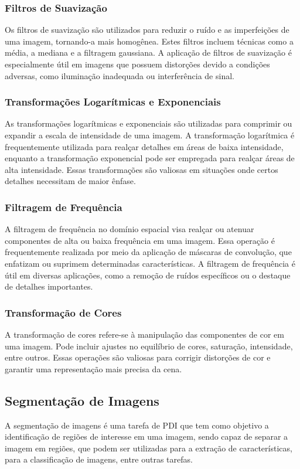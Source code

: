 \documentclass[conference]{IEEEtran}
\begin{document}
\subsubsection{Filtros de Suavização}
Os filtros de suavização são utilizados para reduzir o ruído e as imperfeições de uma imagem,
tornando-a mais homogênea. Estes filtros incluem técnicas como a média, a mediana e a filtragem 
gaussiana. A aplicação de filtros de suavização é especialmente útil em imagens que possuem 
distorções devido a condições adversas, como iluminação inadequada ou interferência de sinal.

\subsubsection{Transformações Logarítmicas e Exponenciais}
As transformações logarítmicas e exponenciais são utilizadas para comprimir ou expandir a 
escala de intensidade de uma imagem. A transformação logarítmica é frequentemente utilizada 
para realçar detalhes em áreas de baixa intensidade, enquanto a transformação exponencial pode 
ser empregada para realçar áreas de alta intensidade. 
Essas transformações são valiosas em situações onde certos detalhes necessitam de maior ênfase.

\subsubsection{Filtragem de Frequência}
A filtragem de frequência no domínio espacial visa realçar ou atenuar componentes 
de alta ou baixa frequência em uma imagem. Essa operação é frequentemente realizada por meio 
da aplicação de máscaras de convolução, que enfatizam ou suprimem determinadas características. 
A filtragem de frequência é útil em diversas aplicações, como a remoção de ruídos específicos 
ou o destaque de detalhes importantes.

\subsubsection{Transformação de Cores}
A transformação de cores refere-se à manipulação das componentes de cor em uma imagem. 
Pode incluir ajustes no equilíbrio de cores, saturação, intensidade, entre outros. 
Essas operações são valiosas para corrigir distorções de cor e garantir uma representação 
mais precisa da cena.

\subsection{Segmentação de Imagens}
A segmentação de imagens é uma tarefa de PDI que tem como objetivo a identificação de regiões de 
interesse em uma imagem, sendo capaz de separar a imagem em regiões, que podem ser utilizadas 
para a extração de características, para a classificação de imagens, entre outras tarefas.
\end{document}
